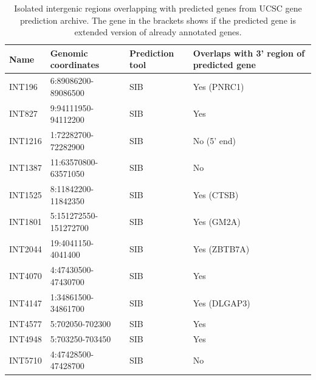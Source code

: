 \begin{table}[h]
    \centering
    \begin{tabular}{llll}
        \toprule
        Name & Genomic coordinates & Prediction tool & Overlaps with 3' region of predicted gene \\
        \midrule
	INT196 & 6:89086200-89086500 & SIB & Yes (PNRC1) \\
	INT827 & 9:94111950-94112200 & SIB & Yes \\
	INT1216 & 1:72282700-72282900 & SIB & No (5' end) \\
	INT1387 & 11:63570800-63571050 & SIB & No \\
	INT1525 & 8:11842200-11842350 & SIB & Yes (CTSB) \\
	INT1801 & 5:151272550-151272700 & SIB & Yes (GM2A) \\
	INT2044 & 19:4041150-4041400 & SIB & Yes (ZBTB7A) \\
	INT4070 & 4:47430500-47430700 & SIB & Yes \\
	INT4147 & 1:34861500-34861700 & SIB & Yes (DLGAP3)\\
	INT4577 & 5:702050-702300 & SIB & Yes \\
	INT4948 & 5:703250-703450 & SIB & Yes \\
	INT5710 & 4:47428500-47428700 & SIB & No \\
        \bottomrule
    \end{tabular}
    \caption{Isolated intergenic regions overlapping with predicted genes from UCSC gene prediction archive.
    The gene in the brackets shows if the predicted gene is extended version of already annotated genes.}
    \label{tab:predictedIsolated}
\end{table}

